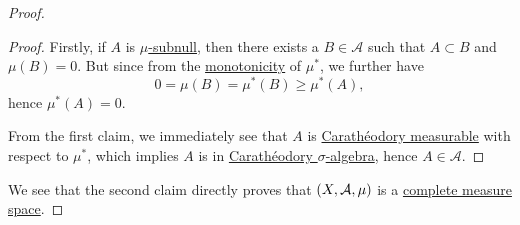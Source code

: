 \begin{proof}
\begin{enumerate}
\begin{proof}
			      \par Firstly, if \(A\) is \hyperref[def:mu-subnull-set]{\(\mu \)-subnull}, then there exists a \(B\in \mathcal{A} \) such that \(A\subset B\) and \(\mu (B) = 0\). But since from
			      the \hyperref[def:outer-measure-montonicity]{monotonicity} of \(\mu ^{*} \), we further have
			      \[
				      0 = \mu(B) = \mu ^{*} (B) \geq \mu ^{*} (A),
			      \]
			      hence \(\mu ^{*} (A) = 0\).

			      \par  From the first claim, we immediately see that \(A\) is \hyperref[def:C-measurable]{Carathéodory measurable} with respect to \(\mu ^{*}\),
			      which implies \(A\) is in \hyperref[thm:Caratheodory-extension-Thm]{Carathéodory \(\sigma\)-algebra}, hence \(A\in \mathcal{A} \).
		      \end{proof}
	\end{enumerate}
	We see that the second claim directly proves that \((X, \mathcal{\MakeUppercase{a}} , \mu )\) is a \hyperref[def:complete-measure-space]{complete measure space}.
\end{proof}

